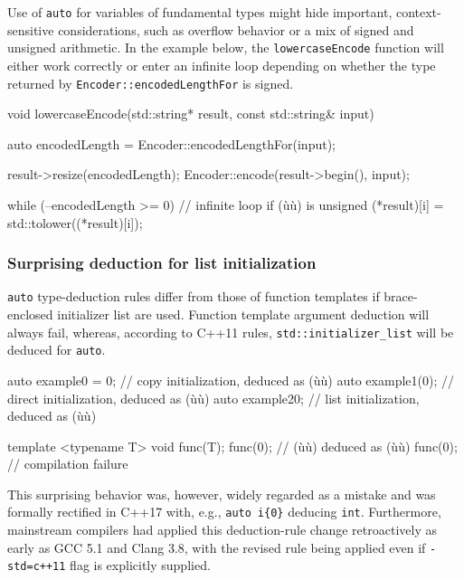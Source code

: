 Use of \lstinline!auto! for variables of fundamental types might hide
important, context-sensitive considerations, such as overflow behavior
or a mix of signed and unsigned arithmetic. In the example below, the
\lstinline!lowercaseEncode! function will either work correctly or enter an
infinite loop depending on whether the type returned by
\lstinline!Encoder::encodedLengthFor! is signed.

\begin{emcppslisting}[language=C++]
void lowercaseEncode(std::string* result, const std::string& input)
{
    auto encodedLength = Encoder::encodedLengthFor(input);

    result->resize(encodedLength);
    Encoder::encode(result->begin(), input);

    while (--encodedLength >= 0)  // infinite loop if (ù{}ù) is unsigned
    {
        (*result)[i] = std::tolower((*result)[i]);
    }
}
\end{emcppslisting}
    

\subsubsection[Surprising deduction for list initialization]{Surprising deduction for list initialization}\label{surprising-deduction-for-list-initialization}

\lstinline!auto! type-deduction rules differ from those of function
templates if brace-enclosed initializer list are used. Function template
argument deduction will always fail, whereas, according to C++11 rules,
\lstinline!std::initializer_list! will be deduced for \lstinline!auto!.

\begin{emcppslisting}[language=C++]
auto example0 = 0; // copy initialization, deduced as (ù{}ù)
auto example1(0);  // direct initialization, deduced as (ù{}ù)
auto example2{0};  // list initialization, deduced as (ù{}ù)

template <typename T> void func(T);
func(0);   // (ù{}ù) deduced as (ù{}ù)
func({0}); // compilation failure
\end{emcppslisting}
    
\noindent This surprising behavior was, however, widely regarded as a mistake and
was formally rectified in C++17 with, e.g., \lstinline!auto!~\lstinline!i{0}!
deducing \lstinline!int!. Furthermore, mainstream compilers had applied
this deduction-rule change retroactively as early as GCC 5.1 and Clang
3.8, with the revised rule being applied even if \lstinline!-std=c++11!
flag is explicitly supplied.

